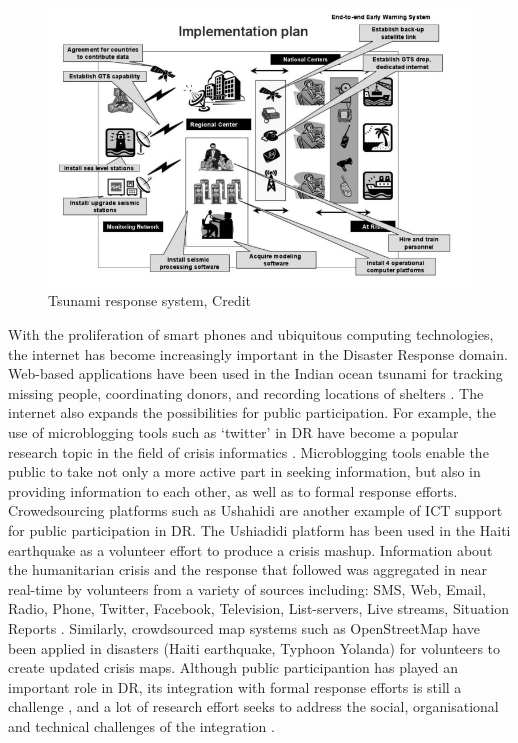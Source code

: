 \begin{figure}[h]
  \centering
  \includegraphics[width=1\textwidth]{img/Background/ICTExample}
  \caption{Tsunami response system, Credit \cite{Wattegama2012} }
  \label{fig:ICTExample}
\end{figure}

With the proliferation of smart phones and ubiquitous computing technologies, the internet has become increasingly important in the Disaster Response domain. Web-based applications have been used in the Indian ocean tsunami for tracking missing people, coordinating donors, and recording locations of shelters \citep{Wattegama2012}. The internet also expands the possibilities for public participation. For example, the use of microblogging tools such as `twitter' in \ac{DR} have become a popular research topic in the field of crisis informatics \citep{Kogan2012,Sarcevic2012,Starbird2010}.  Microblogging tools enable the public to take not only a more active part in seeking information, but also in providing information to each other, as well as to formal response efforts. Crowedsourcing platforms such as Ushahidi \citep{Morrow2011} are another example of \ac{ICT} support for public participation in \ac{DR}. The Ushiadidi platform has been used in the Haiti earthquake as a volunteer effort to produce a crisis mashup. Information about the humanitarian crisis and the response that followed was aggregated in near real-time by volunteers from a variety of sources including: SMS, Web, Email, Radio, Phone, Twitter, Facebook, Television, List-servers, Live streams, Situation Reports \citep{Morrow2011}. Similarly, crowdsourced map systems such as OpenStreetMap \citep{Palen2015} have been applied in disasters (Haiti earthquake, Typhoon Yolanda) for volunteers to create updated crisis maps. Although public participantion has played an important role in \ac{DR}, its integration with formal response efforts is still a challenge \citep{Palen2007}, and a lot of research effort seeks to address the social, organisational and technical challenges of the integration \citep{Dashti2014,Sutton2008}.   \\


